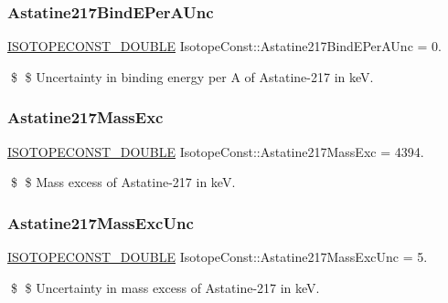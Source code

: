 \subsubsection{\texorpdfstring{Astatine217\+Bind\+E\+Per\+A\+Unc}{Astatine217BindEPerAUnc}}
{\footnotesize\ttfamily \mbox{\hyperlink{group___isotope_const-_macros_ga8f45a7272ce02c0b4c65c44636ed719a}{I\+S\+O\+T\+O\+P\+E\+C\+O\+N\+S\+T\+\_\+\+D\+O\+U\+B\+LE}} Isotope\+Const\+::\+Astatine217\+Bind\+E\+Per\+A\+Unc = 0.}

\$ \$ Uncertainty in binding energy per A of Astatine-\/217 in keV. \mbox{\label{group___isotope_const-_astatine-_at217_ga590eb5500497f9ae1e62e1339cd3ef6a}} 
\subsubsection{\texorpdfstring{Astatine217\+Mass\+Exc}{Astatine217MassExc}}
{\footnotesize\ttfamily \mbox{\hyperlink{group___isotope_const-_macros_ga8f45a7272ce02c0b4c65c44636ed719a}{I\+S\+O\+T\+O\+P\+E\+C\+O\+N\+S\+T\+\_\+\+D\+O\+U\+B\+LE}} Isotope\+Const\+::\+Astatine217\+Mass\+Exc = 4394.}

\$ \$ Mass excess of Astatine-\/217 in keV. \mbox{\label{group___isotope_const-_astatine-_at217_ga62dcec6a7fb058a52790441aaeab95f3}} 
\subsubsection{\texorpdfstring{Astatine217\+Mass\+Exc\+Unc}{Astatine217MassExcUnc}}
{\footnotesize\ttfamily \mbox{\hyperlink{group___isotope_const-_macros_ga8f45a7272ce02c0b4c65c44636ed719a}{I\+S\+O\+T\+O\+P\+E\+C\+O\+N\+S\+T\+\_\+\+D\+O\+U\+B\+LE}} Isotope\+Const\+::\+Astatine217\+Mass\+Exc\+Unc = 5.}

\$ \$ Uncertainty in mass excess of Astatine-\/217 in keV. \mbox{\label{group___isotope_const-_astatine-_at217_ga969211554914b990672f5376d531165f}} 
